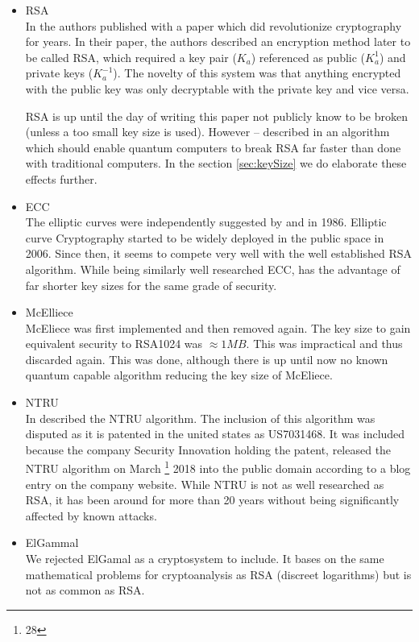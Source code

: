 \begin{itemize}
	\item RSA\\
	In \citeyear{Rivest:1978:MOD:359340.359342} the authors \citeauthor{Rivest:1978:MOD:359340.359342} published with \cite{Rivest:1978:MOD:359340.359342} a paper which did revolutionize cryptography for years. In their paper, the authors described an encryption method later to be called RSA, which required a key pair ($K_a$) referenced as public ($K^{1}_a$) and private keys ($K^{-1}_a$). The novelty of this system was that anything encrypted with the public key was only decryptable with the private key and vice versa.
	
	RSA is up until the day of writing this paper not publicly know to be broken (unless a too small key size is used). However -- \citeauthor{Shor97polynomial-timealgorithms} described in \citeyear{Shor97polynomial-timealgorithms} an algorithm which should enable quantum computers to break RSA far faster than done with traditional computers. In the section \ref{sec:keySize} we do elaborate these effects further.
	\item ECC\\
	The elliptic curves were independently suggested by \cite{Miller1986} and \cite{Koblitz04guideto} in 1986. Elliptic curve Cryptography started to be widely deployed in the public space in 2006. Since then, it seems to compete very well with the well established RSA algorithm. While being similarly well researched ECC, has the advantage of far shorter key sizes for the same grade of security.
	\item McElliece\\
	McEliece was first implemented and then removed again. The key size to gain equivalent security to RSA1024 was $\approx 1MB$. This was impractical and thus discarded again. This was done, although there is up until now no known quantum capable algorithm reducing the key size of McEliece.
	\item NTRU\\
	In \cite{Hoffstein1998} \citeauthor{Hoffstein1998} described the NTRU algorithm. The inclusion of this algorithm was disputed as it is patented in the united states as US7031468. It was included because the company Security Innovation holding the patent, released the NTRU algorithm on March \thanks{28} 2018 into the public domain according to a blog entry on the company website. While NTRU is not as well researched as RSA, it has been around for more than 20 years without being significantly affected by known attacks.
	\item ElGammal\\
	We rejected ElGamal as a cryptosystem to include. It bases on the same mathematical problems for cryptoanalysis as RSA (discreet logarithms) but is not as common as RSA.
\end{itemize}


